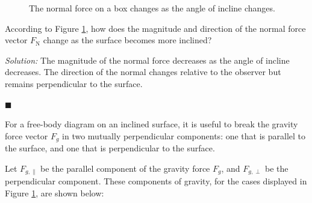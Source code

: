 \documentclass[dvipsnames]{article}
\begin{document}
\begin{figure}[H]
\begin{minipage}{3cm}
\begin{tikzpicture}[x=5mm,y=5mm,rotate=-60]
\end{tikzpicture}
\end{minipage}%
\hspace{2mm}
\begin{minipage}{3cm}
\centering
{}
\end{minipage}
\caption{The normal force on a box changes as the angle of incline changes.}
\label{Zmibb}
\end{figure}

\begin{example}
According to Figure \ref{Zmibb}, how does the magnitude and direction of the normal force vector $F_\mathrm{N}$ change as the surface becomes more inclined?
\end{example}

\textit{Solution:}
The magnitude of the normal force decreases as the angle of incline decreases. The direction of the normal changes relative to the observer but remains perpendicular to the surface.

\hfill $\blacksquare$

For a free-body diagram on an inclined surface, it is useful to break the gravity force vector $F_g$ in two mutually perpendicular components: one that is parallel to the surface, and one that is perpendicular to the surface. 

Let $F_{g,\parallel}$ be the parallel component of the gravity force $F_g$, and $F_{g,\perp}$ be the perpendicular component. These components of gravity, for the cases displayed in Figure \ref{Zmibb}, are shown below:
\end{document}
